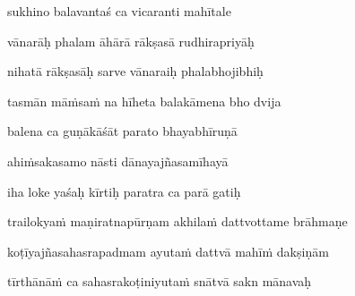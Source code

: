 sukhino balavantaś ca vicaranti mahītale \veg\dontdisplaylinenum

vānarāḥ phalam āhārā rākṣasā rudhirapriyāḥ\thinspace{\dandab} \dontdisplaylinenum

nihatā rākṣasāḥ sarve vānaraiḥ phalabhojibhiḥ \veg\dontdisplaylinenum

tasmān mā\.msa\.m na hīheta balakāmena bho dvija\thinspace{\dandab} \dontdisplaylinenum

balena ca guṇākāśāt parato bhayabhīruṇā \veg\dontdisplaylinenum

ahi\.msakasamo nāsti dānayajñasamīhayā\thinspace{\dandab} \dontdisplaylinenum

iha loke yaśaḥ kīrtiḥ paratra ca parā gatiḥ \veg\dontdisplaylinenum

\ujvers\nemsloka 
trailokya\.m maṇiratnapūrṇam akhila\.m dattvottame brāhmaṇe
\dontdisplaylinenum

\nemslokab 
koṭīyajñasahasrapadmam ayuta\.m dattvā mahī\.m dakṣiṇām \danda\dontdisplaylinenum

\nemslokac 
tīrthānā\.m ca sahasrakoṭiniyuta\.m snātvā sakn mānavaḥ
\dontdisplaylinenum

